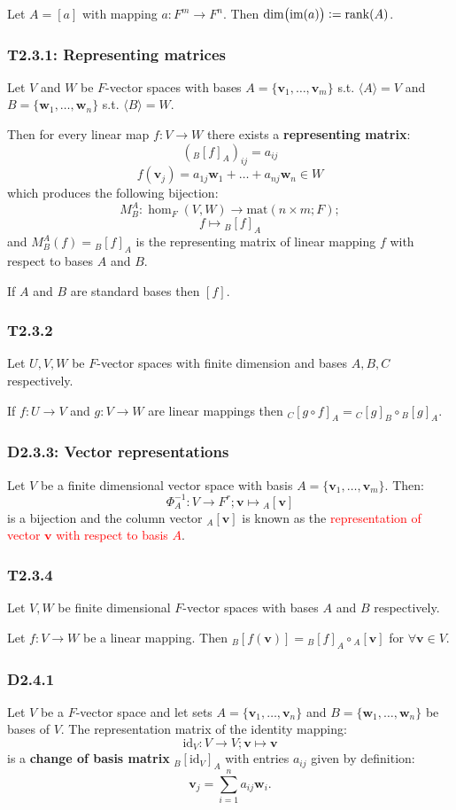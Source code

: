 \documentclass{article}
\newcommand{\deq}{\vcentcolon=}
\newcommand{\vc}[1]{\boldsymbol{#1}}
\begin{document}
\begin{multicols*}{3}
Let $A=[a]$ with mapping $a:F^m\rightarrow F^n$.
Then $\dim\bigl(\text{im}(a)\bigr)\deq\rank(A)$.

\subsubsection*{T2.3.1: Representing matrices}
Let $V$ and $W$ be $F$-vector spaces
with bases $A=\{\vc{v}_1,\dots,\vc{v}_m\}$
s.t. $\langle A\rangle=V$
and $B=\{\vc{w}_1,\dots,\vc{w}_n\}$
s.t. $\langle B\rangle=W$.

Then for every linear map $f:V\rightarrow W$
there exists a \textbf{representing matrix}:
$$({}_{B}[f]_A)_{ij}=a_{ij}$$
$$f(\vc{v}_j)=a_{1j}\vc{w}_1+\dots+a_{nj}\vc{w}_n\in W$$
which produces the following bijection:
$$M_B^A:\hom_F(V,W)\rightarrow\text{mat}(n\times m;F);$$
$$f\mapsto{}_B[f]_A$$
and $M_B^A(f)={}_B[f]_A$ is the representing matrix
of linear mapping $f$ 
with respect to bases $A$ and $B$.

If $A$ and $B$ are standard bases then $[f]$.

\subsubsection*{T2.3.2}
Let $U,V,W$ be $F$-vector spaces with finite dimension
and bases $A,B,C$ respectively.

If $f:U\rightarrow V$ and $g:V\rightarrow W$
are linear mappings then
${}_C[g\circ f]_A={}_C[g]_B\circ{}_B[g]_A$.

\subsubsection*{D2.3.3: Vector representations}
Let $V$ be a finite dimensional vector space
with basis $A=\{\vc{v}_1,\dots,\vc{v}_m\}$.
Then:
$$\Phi_A^{-1}:V\rightarrow F^r;
\vc{v}\mapsto{}_A[\vc{v}]$$
is a bijection and the column vector ${}_A[\vc{v}]$
is known as the \textcolor{red}{representation
of vector $\vc{v}$ with respect to basis $A$}.

\subsubsection*{T2.3.4}
Let $V,W$ be finite dimensional $F$-vector spaces
with bases $A$ and $B$ respectively.

Let $f:V\rightarrow W$ be a linear mapping.
Then ${}_B[f(\vc{v})]={}_B[f]_A\circ {}_A[\vc{v}]$
for $\forall\vc{v}\in V$.

\subsubsection*{D2.4.1}
Let $V$ be a $F$-vector space
and let sets
$A=\{\vc{v}_1,\dots,\vc{v}_n\}$
and $B=\{\vc{w}_1,\dots,\vc{w}_n\}$
be bases of $V$.
The representation matrix of the identity mapping:
$$\text{id}_V:V\rightarrow V;
\vc{v}\mapsto\vc{v}$$
is a \textbf{change of basis matrix}
${}_B[\text{id}_V]_A$ with entries $a_{ij}$
given by definition:
$$\vc{v}_j=\sum_{i=1}^{n}a_{ij}\vc{w}_i.$$


\end{multicols*}
\end{document}
